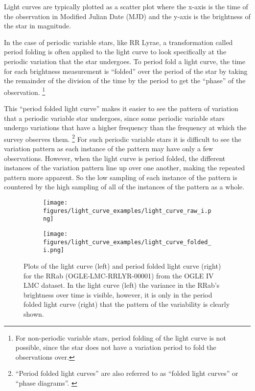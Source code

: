 \documentclass[]{article}
\begin{document}
Light curves are typically plotted as a scatter plot where the x-axis is the time of the observation in Modified Julian Date (MJD) and the y-axis is the brightness of the star in magnitude. \cite{AAVSO_nodate}

In the case of periodic variable stars, like RR Lyrae, a transformation called period folding is often applied to the light curve to look specifically at the periodic variation that the star undergoes. To period fold a light curve, the time for each brightness measurement is ``folded'' over the period of the star by taking the remainder of the division of the time by the period to get the ``phase'' of the observation. \footnote{For non-periodic variable stars, period folding of the light curve is not possible, since the star does not have a variation period to fold the observations over.} \cite{AAVSO_nodate}

This ``period folded light curve'' makes it easier to see the pattern of variation that a periodic variable star undergoes, since some periodic variable stars undergo variations that have a higher frequency than the frequency at which the survey observes them. \footnote{``Period folded light curves'' are also referred to as ``folded light curves'' or ``phase diagrams''. \cite{AAVSO_nodate}} For such periodic variable stars it is difficult to see the variation pattern as each instance of the pattern may have only a few observations. However, when the light curve is period folded, the different instances of the variation pattern line up over one another, making the repeated pattern more apparent. So the low sampling of each instance of the pattern is countered by the high sampling of all of the instances of the pattern as a whole. \cite{AAVSO_nodate}

\begin{figure}
	\centering
	\begin{subfigure}{.5\textwidth}
		\centering
		\texttt{[image: figures/light\_curve\_examples/light\_curve\_raw\_i.png]}
		\label{fig:light_curve_raw_i}
	\end{subfigure}%
	\begin{subfigure}{.5\textwidth}
		\centering
		\texttt{[image: figures/light\_curve\_examples/light\_curve\_folded\_i.png]}
		\label{fig:sub2}
	\end{subfigure}
	\caption{Plots of the light curve (left) and period folded light curve (right) for the RRab (OGLE-LMC-RRLYR-00001) from the OGLE IV LMC dataset. In the light curve (left) the variance in the RRab’s brightness over time is visible, however, it is only in the period folded light curve (right) that the pattern of the variability is clearly shown.}
	\label{fig:light_curves}
\end{figure}
\end{document}
